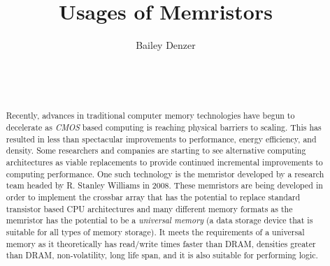\documentclass{sig-alternate}
\begin{document}

\title{Usages of Memristors}


\author{
\alignauthor
Bailey Denzer\\
	\\
	\\
	\\
}

\maketitle
\begin{abstract}

Recently, advances in traditional computer memory technologies  have begun to decelerate as \textit{CMOS} based computing is reaching physical barriers to scaling.  This has resulted in less than spectacular improvements to performance, energy efficiency, and density.  Some researchers and companies are starting to see alternative computing architectures as viable replacements to provide continued incremental improvements to computing performance.  One such technology is the memristor developed by a research team headed by R. Stanley Williams in 2008.  These memristors are being developed in order to implement the crossbar array that has the potential to replace standard transistor based CPU architectures and many different memory formats as the memristor has the potential to be a \textit{universal memory} (a data storage device that is suitable for all types of memory storage).  It meets the requirements of a universal memory as it theoretically has read/write times faster than DRAM, densities greater than DRAM, non-volatility, long life span, and it is also suitable for performing logic.

\end{abstract}

\end{document}
